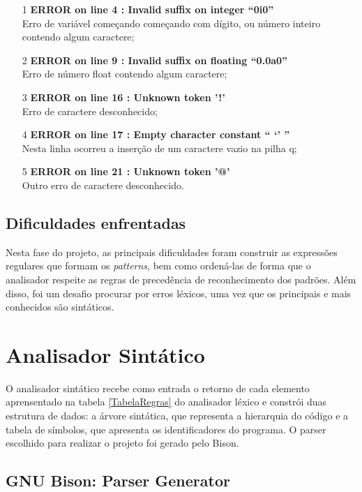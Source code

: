 \documentclass[12pt]{article}
\begin{document}
\begin{itemize}
  \item[1] \textbf{ERROR on line 4 : Invalid suffix on integer ``0i0''} \\ Erro de variável começando começando com dígito, ou número inteiro contendo algum caractere;
  \item[2] \textbf{ERROR on line 9 : Invalid suffix on floating ``0.0a0''} \\ Erro de número float contendo algum caractere;
  \item[3] \textbf{ERROR on line 16 : Unknown token '!'} \\  Erro de caractere desconhecido;
  \item[4] \textbf{ERROR on line 17 : Empty character constant `` `' ''} \\ Nesta linha ocorreu a inserção de um caractere vazio na pilha q;
  \item[5] \textbf{ERROR on line 21 : Unknown token '@'} \\ Outro erro de caractere desconhecido.
\end{itemize}

\subsection{Dificuldades enfrentadas}

\indent Nesta fase do projeto, as principais dificuldades foram construir as expressões regulares que formam os \textit{patterns}, bem como ordená-las de forma que o analisador respeite as regras de precedência de reconhecimento dos padrões. Além disso, foi um desafio procurar por erros léxicos, uma vez que os principais e mais conhecidos são sintáticos.


\section{Analisador Sintático}

\indent O analisador sintático recebe como entrada o retorno de cada elemento aprensentado na tabela \ref{TabelaRegras} do analisador léxico e constrói duas estrutura de dados: a árvore sintática, que representa a hierarquia do código e a tabela de símbolos, que apresenta os identificadores do programa. O parser escolhido para realizar o projeto foi gerado pelo Bison.

\subsection{GNU Bison: Parser Generator}
\end{document}
